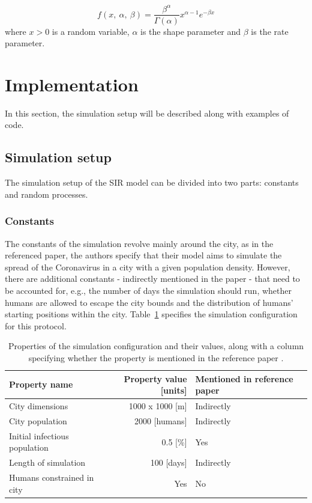 \documentclass[a4paper]{article}
\begin{document}
\begin{equation}
	f(x,\:\alpha,\:\beta) = \frac{\beta^\alpha}{\Gamma \left(\alpha\right)} x^{\alpha-1} e^{-\beta x}
	\label{equation:gamma-distr}
\end{equation}
\noindent
where $x > 0$ is a random variable, $\alpha$ is the shape parameter and $\beta$ is the rate parameter.



\section{Implementation}\label{section:implementation}
In this section, the simulation setup will be described along with examples of code.

\subsection{Simulation setup}
The simulation setup of the SIR model can be divided into two parts: constants and random processes.

\subsubsection{Constants}
The constants of the simulation revolve mainly around the city, as in the referenced paper, the authors specify that their model aims to simulate the spread of the Coronavirus in a city with a given population density. However, there are additional constants - indirectly mentioned in the paper - that need to be accounted for, e.g., the number of days the simulation should run, whether humans are allowed to escape the city bounds and the distribution of humans' starting positions within the city. Table~\ref{table:simulation-configuration} specifies the simulation configuration for this protocol.

\begin{table}[!h]
	\centering
	\begin{tabular}{ |l|r|l|  }
		\hline
		Property name & Property value [units] & Mentioned in reference paper \\
		\hline
		\hline
		City dimensions               & 1000 x 1000 [m] & Indirectly \\
		City population               & 2000 [humans]   & Indirectly \\
		Initial infectious population & 0.5 [\%]        & Yes 	  	 \\
		Length of simulation          & 100 [days]      & Indirectly \\
		Humans constrained in city    & Yes             & No         \\
		\hline
	\end{tabular}
	\caption{Properties of the simulation configuration and their values, along with a column specifying whether the property is mentioned in the reference paper \cite{Maltezos2021}.}
	\label{table:simulation-configuration}
\end{table}
\end{document}
